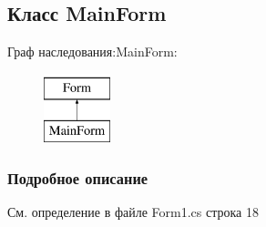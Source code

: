 \subsection{Класс Main\+Form}
\label{classkdz__manager_1_1_main_form}
Граф наследования\+:Main\+Form\+:\begin{figure}[H]
\begin{center}
\leavevmode
\includegraphics[height=2.000000cm]{classkdz__manager_1_1_main_form}
\end{center}
\end{figure}


\subsubsection{Подробное описание}


См. определение в файле Form1.\+cs строка 18

